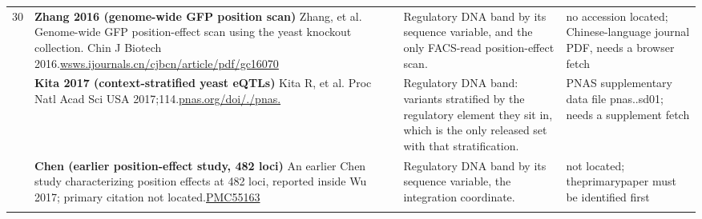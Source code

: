 \begin{landscape}
\begin{longtable}{@{}r@{\hspace{4pt}} L{78mm} L{72mm} L{76mm}@{}}
30 & \textbf{Zhang 2016 (genome-wide GFP position scan)} \newline Zhang, et al. Genome-wide GFP position-effect scan using the yeast knockout collection. Chin J Biotech 2016.\newline \href{https://wsws.ijournals.cn/cjbcn/article/pdf/gc16070901}{wsws.\allowbreak ijourna\allowbreak ls.\allowbreak cn/\allowbreak cjbcn/\allowbreak article\allowbreak /\allowbreak pdf/\allowbreak gc16070} & Regulatory DNA band by its sequence variable, and the only FACS-read position-effect scan. & no acces\allowbreak sion loc\allowbreak ated; Ch\allowbreak inese-\allowbreak languag\allowbreak e journa\allowbreak l PDF, n\allowbreak eeds a b\allowbreak rowser f\allowbreak etch \\
 & \textbf{Kita 2017 (context-stratified yeast eQTLs)} \newline Kita R, et al. Proc Natl Acad Sci USA 2017;114.\newline \href{https://www.pnas.org/doi/10.1073/pnas.1717421114}{pnas.\allowbreak org/\allowbreak doi/./\allowbreak pnas.} & Regulatory DNA band: variants stratified by the regulatory element they sit in, which is the only released set with that stratification. & PNAS sup\allowbreak plementa\allowbreak ry data \allowbreak file pna\allowbreak s..\allowbreak sd01; n\allowbreak eeds a s\allowbreak upplemen\allowbreak t fetch \\
 & \textbf{Chen (earlier position-effect study, 482 loci)} \newline An earlier Chen study characterizing position effects at 482 loci, reported inside Wu 2017; primary citation not located.\newline \href{https://www.ncbi.nlm.nih.gov/pmc/articles/PMC5516366/}{PMC55163} & Regulatory DNA band by its sequence variable, the integration coordinate. & not loca\allowbreak ted; the\allowbreak  primary\allowbreak  paper m\allowbreak ust be i\allowbreak dentifie\allowbreak d first \\
\addlinespace[5pt]

\end{longtable}
\end{landscape}
